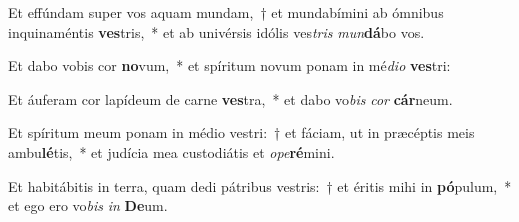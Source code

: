 \item Et effúndam super vos aquam mundam,~† et mundabímini ab ómnibus inquinaméntis \textbf{ves}tris,~* et ab univérsis idólis ves\textit{tris} \textit{mun}\textbf{dá}bo vos.
\item Et dabo vobis cor \textbf{no}vum,~* et spíritum novum ponam in mé\textit{di}\textit{o} \textbf{ves}tri:
\item Et áuferam cor lapídeum de carne \textbf{ves}tra,~* et dabo vo\textit{bis} \textit{cor} \textbf{cár}neum.
\item Et spíritum meum ponam in médio vestri:~† et fáciam, ut in præcéptis meis ambu\textbf{lé}tis,~* et judícia mea custodiátis et \textit{o}\textit{pe}\textbf{ré}mini.
\item Et habitábitis in terra, quam dedi pátribus vestris:~† et éritis mihi in \textbf{pó}pulum,~* et ego ero vo\textit{bis} \textit{in} \textbf{De}um.
